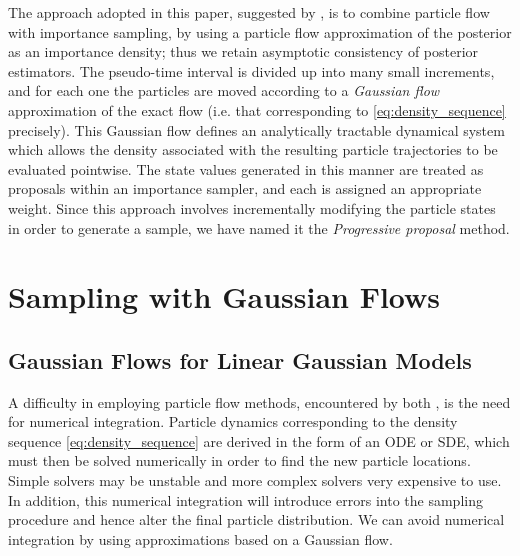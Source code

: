 \documentclass{article}
\begin{document}
The approach adopted in this paper, suggested by \cite{Reich2012a}, is to combine particle flow with importance sampling, by using a particle flow approximation of the posterior as an importance density; thus we retain asymptotic consistency of posterior estimators. The pseudo-time interval is divided up into many small increments, and for each one the particles are moved according to a \emph{Gaussian flow} approximation of the exact flow (i.e. that corresponding to \eqref{eq:density_sequence} precisely). This Gaussian flow defines an analytically tractable dynamical system which allows the density associated with the resulting particle trajectories to be evaluated pointwise. The state values generated in this manner are treated as proposals within an importance sampler, and each is assigned an appropriate weight. Since this approach involves incrementally modifying the particle states in order to generate a sample, we have named it the \emph{Progressive proposal} method.



\section{Sampling with Gaussian Flows}

\subsection{Gaussian Flows for Linear Gaussian Models}

A difficulty in employing particle flow methods, encountered by both \cite{Daum2011d,Reich2011}, is the need for numerical integration. Particle dynamics corresponding to the density sequence \eqref{eq:density_sequence} are derived in the form of an ODE or SDE, which must then be solved numerically in order to find the new particle locations. Simple solvers may be unstable and more complex solvers very expensive to use. In addition, this numerical integration will introduce errors into the sampling procedure and hence alter the final particle distribution. We can avoid numerical integration by using approximations based on a Gaussian flow.
\end{document}
